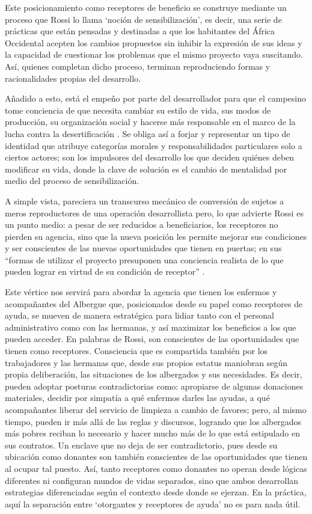 \documentclass[
  spanish,
  11pt,
  a4paper,
]{scrbook}
\begin{document}
Este posicionamiento como receptores de beneficio se construye mediante
un proceso que Rossi lo llama `noción de sensibilización', es decir, una
serie de prácticas que están pensadas y destinadas a que los habitantes
del África Occidental acepten los cambios propuestos sin inhibir la
expresión de sus ideas y la capacidad de cuestionar los problemas que el
mismo proyecto vaya suscitando. Así, quienes completan dicho proceso,
terminan reproduciendo formas y racionalidades propias del desarrollo.

Añadido a esto, está el empeño por parte del desarrollador para que el
campesino tome conciencia de que necesita cambiar su estilo de vida, sus
modos de producción, su organización social y hacerse más responsable en
el marco de la lucha contra la desertificación \autocite[36]{Rossi2006}.
Se obliga así a forjar y representar un tipo de identidad que atribuye
categorías morales y responsabilidades particulares solo a ciertos
actores; son los impulsores del desarrollo los que deciden quiénes deben
modificar su vida, donde la clave de solución es el cambio de mentalidad
por medio del proceso de sensibilización.

A simple vista, pareciera un transcurso mecánico de conversión de
sujetos a meros reproductores de una operación desarrollista pero, lo
que advierte Rossi es un punto medio: a pesar de ser reducidos a
beneficiarios, los receptores no pierden su agencia, sino que la nueva
posición les permite mejorar sus condiciones y ser conscientes de las
nuevas oportunidades que tienen en puertas; en sus ``formas de utilizar
el proyecto presuponen una conciencia realista de lo que pueden lograr
en virtud de su condición de receptor'' \autocite[29]{Rossi2006}.

Este vértice nos servirá para abordar la agencia que tienen los enfermos
y acompañantes del Albergue que, posicionados desde su papel como
receptores de ayuda, se mueven de manera estratégica para lidiar tanto
con el personal administrativo como con las hermanas, y así maximizar
los beneficios a los que pueden acceder. En palabras de Rossi, son
conscientes de las oportunidades que tienen como receptores. Consciencia
que es compartida también por los trabajadores y las hermanas que, desde
sus propios estatus maniobran según propia deliberación, las situaciones
de los albergados y sus necesidades. Es decir, pueden adoptar posturas
contradictorias como: apropiarse de algunas donaciones materiales,
decidir por simpatía a qué enfermos darles las ayudas, a qué
acompañantes liberar del servicio de limpieza a cambio de favores; pero,
al mismo tiempo, pueden ir más allá de las reglas y discursos, logrando
que los albergados más pobres reciban lo necesario y hacer mucho más de
lo que está estipulado en sus contratos. Un enclave que no deja de ser
contradictorio, pues desde su ubicación como donantes son también
conscientes de las oportunidades que tienen al ocupar tal puesto. Así,
tanto receptores como donantes no operan desde lógicas diferentes ni
configuran mundos de vidas separados, sino que ambos desarrollan
estrategias diferenciadas según el contexto desde donde se ejerzan. En
la práctica, aquí la separación entre `otorgantes y receptores de ayuda'
no es para nada útil.
\end{document}
